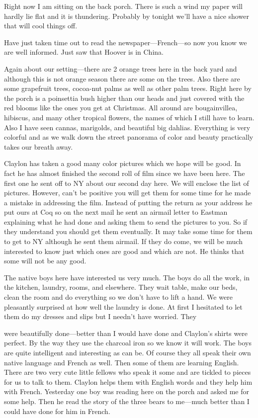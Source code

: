 \documentclass[
]{book}
\begin{document}
Right now I am sitting on the back porch. There is such a wind my paper will hardly lie flat and it is thundering. Probably by tonight we'll have a nice shower that will cool things off.

Have just taken time out to read the newspaper---French---so now you know we are well informed. Just saw that Hoover is in China.

Again about our setting---there are 2 orange trees here in the back yard and although this is not orange season there are some on the trees. Also there are some grapefruit trees, cocoa-nut palms as well as other palm trees. Right here by the porch is a poinsettia bush higher than our heads and just covered with the red blooms like the ones you get at Christmas. All around are bougainvillea, hibiscus, and many other tropical flowers, the names of which I still have to learn. Also I have seen cannas, marigolds, and beautiful big dahlias. Everything is very colorful and as we walk down the street panorama of color and beauty practically takes our breath away.

Claylon has taken a good many color pictures which we hope will be good. In fact he has almost finished the second roll of film since we have been here. The first one he sent off to NY about our second day here. We will enclose the list of pictures. However, can't be positive you will get them for some time for he made a mistake in addressing the film. Instead of putting the return as your address he put ours at Coq so on the next mail he sent an airmail letter to Eastman explaining what he had done and asking them to send the pictures to you. So if they understand you should get them eventually. It may take some time for them to get to NY although he sent them airmail. If they do come, we will be much interested to know just which ones are good and which are not. He thinks that some will not be any good.

The native boys here have interested us very much. The boys do all the work, in the kitchen, laundry, rooms, and elsewhere. They wait table, make our beds, clean the room and do everything so we don't have to lift a hand. We were pleasantly surprised at how well the laundry is done. At first I hesitated to let them do my dresses and slips but I needn't have worried. They

were beautifully done---better than I would have done and Claylon's shirts were perfect. By the way they use the charcoal iron so we know it will work. The boys are quite intelligent and interesting as can be. Of course they all speak their own native language and French as well. Then some of them are learning English. There are two very cute little fellows who speak it some and are tickled to pieces for us to talk to them. Claylon helps them with English words and they help him with French. Yesterday one boy was reading here on the porch and asked me for some help. Then he read the story of the three bears to me---much better than I could have done for him in French.
\end{document}
